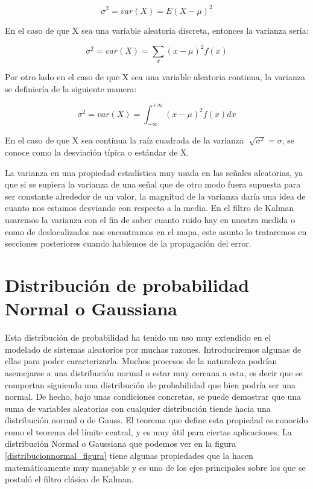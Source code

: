 \begin{equation}\label{varianza}
\sigma^2 = var(X) = E(X - \mu)^2
\end{equation}

En el caso de que X sea una variable aleatoria discreta, entonces la varianza sería:

\begin{equation}\label{varianzadiscreta}
\sigma^2 = var(X) = \sum_{x}(x-\mu)^2 f(x)
\end{equation}

Por otro lado en el caso de que X sea una variable aleatoria continua, la varianza se definiería de la siguiente manera:

\begin{equation}\label{varianzacontinua}
\sigma^2 = var(X) = \int_{-\infty}^{+\infty}(x-\mu)^2 f(x) dx
\end{equation}

En el caso de que X sea continua la raíz cuadrada de la varianza $\sqrt[]{\sigma^2} = \sigma $, se conoce como la desviación típica o estándar de X.

La varianza en una propiedad estadística muy usada en las señales aleatorias, ya que si se supiera la varianza de una señal que de otro modo fuera supuesta para ser constante alrededor de un valor, la magnitud de la varianza daría una idea de cuanto nos estamos desviando con respecto a la media.
En el filtro de Kalman usaremos la varianza con el fin de saber cuanto ruido hay en nuestra medida o como de deslocalizados nos encontramos en el mapa, este asunto lo trataremos en secciones posteriores cuando hablemos de la propagación del error.

\section{Distribución de probabilidad Normal o Gaussiana}
Esta distribución de probabilidad ha tenido un uso muy extendido en el modelado de sistemas aleatorios por muchas razones.
Introduciremos algunas de ellas para poder caracterizarla. 
Muchos procesos de la naturaleza podrían asemejarse a una distribución normal o estar muy cercana a esta, es decir que se comportan siguiendo una distribución de probabilidad que bien podría ser una normal.
De hecho, bajo unas condiciones concretas, se puede demostrar que una suma de variables aleatorias con cualquier distribución tiende hacia una distribución normal o de Gauss. 
El teorema que define esta propiedad es conocido como el teorema del límite central, y es muy útil para ciertas aplicaciones. 
La distribución Normal o Gaussiana que podemos ver en la figura \ref{distribucionnormal_figura} tiene algunas propiedades que la hacen matemáticamente muy manejable y es uno de los ejes principales sobre los que se postuló el filtro clásico de Kalman.

